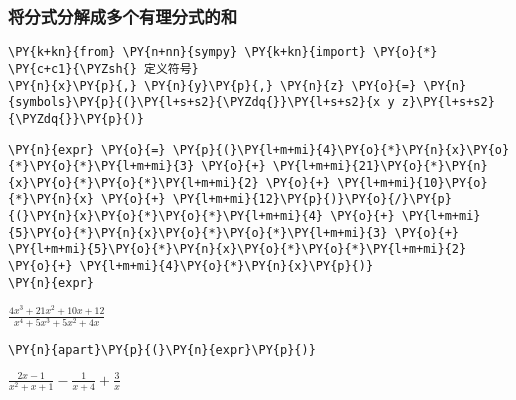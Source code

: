     \hypertarget{ux5c06ux5206ux5f0fux5206ux89e3ux6210ux591aux4e2aux6709ux7406ux5206ux5f0fux7684ux548c}{%
\subsubsection{将分式分解成多个有理分式的和}\label{ux5c06ux5206ux5f0fux5206ux89e3ux6210ux591aux4e2aux6709ux7406ux5206ux5f0fux7684ux548c}}

    \begin{tcolorbox}[breakable, size=fbox, boxrule=1pt, pad at break*=1mm,colback=cellbackground, colframe=cellborder]
\begin{Verbatim}[commandchars=\\\{\}]
\PY{k+kn}{from} \PY{n+nn}{sympy} \PY{k+kn}{import} \PY{o}{*}
\PY{c+c1}{\PYZsh{} 定义符号}
\PY{n}{x}\PY{p}{,} \PY{n}{y}\PY{p}{,} \PY{n}{z} \PY{o}{=} \PY{n}{symbols}\PY{p}{(}\PY{l+s+s2}{\PYZdq{}}\PY{l+s+s2}{x y z}\PY{l+s+s2}{\PYZdq{}}\PY{p}{)}
\end{Verbatim}
\end{tcolorbox}

    \begin{tcolorbox}[breakable, size=fbox, boxrule=1pt, pad at break*=1mm,colback=cellbackground, colframe=cellborder]
\begin{Verbatim}[commandchars=\\\{\}]
\PY{n}{expr} \PY{o}{=} \PY{p}{(}\PY{l+m+mi}{4}\PY{o}{*}\PY{n}{x}\PY{o}{*}\PY{o}{*}\PY{l+m+mi}{3} \PY{o}{+} \PY{l+m+mi}{21}\PY{o}{*}\PY{n}{x}\PY{o}{*}\PY{o}{*}\PY{l+m+mi}{2} \PY{o}{+} \PY{l+m+mi}{10}\PY{o}{*}\PY{n}{x} \PY{o}{+} \PY{l+m+mi}{12}\PY{p}{)}\PY{o}{/}\PY{p}{(}\PY{n}{x}\PY{o}{*}\PY{o}{*}\PY{l+m+mi}{4} \PY{o}{+} \PY{l+m+mi}{5}\PY{o}{*}\PY{n}{x}\PY{o}{*}\PY{o}{*}\PY{l+m+mi}{3} \PY{o}{+} \PY{l+m+mi}{5}\PY{o}{*}\PY{n}{x}\PY{o}{*}\PY{o}{*}\PY{l+m+mi}{2} \PY{o}{+} \PY{l+m+mi}{4}\PY{o}{*}\PY{n}{x}\PY{p}{)}
\PY{n}{expr}
\end{Verbatim}
\end{tcolorbox}
 
            
    
    $\displaystyle \frac{4 x^{3} + 21 x^{2} + 10 x + 12}{x^{4} + 5 x^{3} + 5 x^{2} + 4 x}$

    

    \begin{tcolorbox}[breakable, size=fbox, boxrule=1pt, pad at break*=1mm,colback=cellbackground, colframe=cellborder]
\begin{Verbatim}[commandchars=\\\{\}]
\PY{n}{apart}\PY{p}{(}\PY{n}{expr}\PY{p}{)}
\end{Verbatim}
\end{tcolorbox}
 
            
    
    $\displaystyle \frac{2 x - 1}{x^{2} + x + 1} - \frac{1}{x + 4} + \frac{3}{x}$

